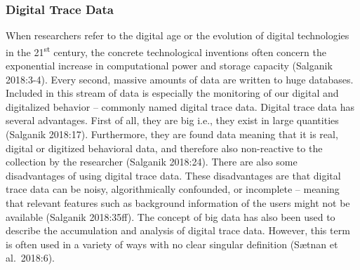 \documentclass[
]{article}
\begin{document}
\hypertarget{digital-trace-data}{%
\subsubsection{Digital Trace Data}\label{digital-trace-data}}

\noindent When researchers refer to the digital age or the evolution of
digital technologies in the 21\textsuperscript{st} century, the concrete
technological inventions often concern the exponential increase in
computational power and storage capacity (Salganik 2018:3-4). Every
second, massive amounts of data are written to huge databases. Included
in this stream of data is especially the monitoring of our digital and
digitalized behavior -- commonly named digital trace data. Digital trace
data has several advantages. First of all, they are big i.e., they exist
in large quantities (Salganik 2018:17). Furthermore, they are found data
meaning that it is real, digital or digitized behavioral data, and
therefore also non-reactive to the collection by the researcher
(Salganik 2018:24). There are also some disadvantages of using digital
trace data. These disadvantages are that digital trace data can be
noisy, algorithmically confounded, or incomplete -- meaning that
relevant features such as background information of the users might not
be available (Salganik 2018:35ff). The concept of big data has also been
used to describe the accumulation and analysis of digital trace data.
However, this term is often used in a variety of ways with no clear
singular definition (Sætnan et al.~2018:6).
\end{document}
